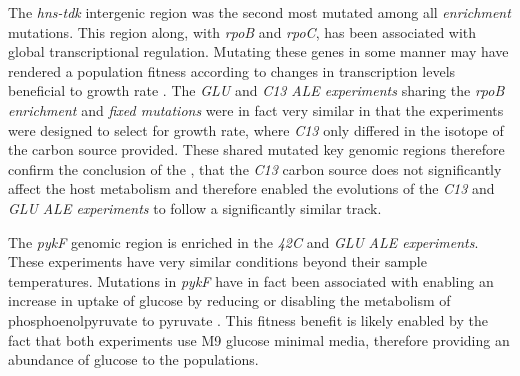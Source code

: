 \documentclass[12pt,final,masters,chapterheads]{ucsd}  %
\begin{document}
The \textit{hns-tdk} intergenic region was the second most mutated among all \textit{enrichment} mutations. This region along, with \textit{rpoB} and \textit{rpoC}, has been associated with global transcriptional regulation. Mutating these genes in some manner may have rendered a population fitness according to changes in transcription levels beneficial to growth rate \cite{Kobayashi01011990, AYERS1989749, Cheng2014, Wang1445}. The \textit{GLU} and \textit{C13} \textit{ALE experiments} sharing the \textit{rpoB} \textit{enrichment} and \textit{fixed mutations} were in fact very similar in that the experiments were designed to select for growth rate, where \textit{C13} only differed in the isotope of the carbon source provided. These shared mutated key genomic regions therefore confirm the conclusion of the \cite{pmid26964043}, that the \textit{C13} carbon source does not significantly affect the host metabolism and therefore enabled the evolutions of the \textit{C13} and \textit{GLU} \textit{ALE experiments} to follow a significantly similar track.

The \textit{pykF} genomic region is enriched in the \textit{42C} and \textit{GLU} \textit{ALE experiments}. These experiments have very similar conditions beyond their sample temperatures. Mutations in \textit{pykF} have in fact been associated with enabling an increase in uptake of glucose by reducing or disabling the metabolism of phosphoenolpyruvate to pyruvate \cite{Woods13062006, 10.1371/journal.pgen.1001164, Blank25022014}. This fitness benefit is likely enabled by the fact that both experiments use M9 glucose minimal media, therefore providing an abundance of glucose to the populations.
\end{document}

